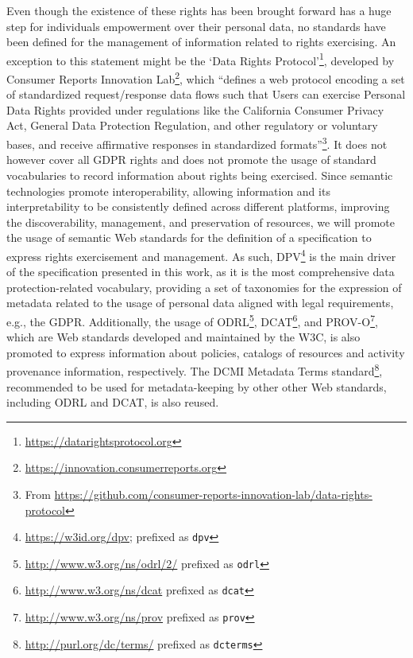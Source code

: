 \documentclass{IOS-Book-Article}     %
\begin{document}
Even though the existence of these rights has been brought forward has a huge step for individuals empowerment over their personal data, no standards have been defined for the management of information related to rights exercising.
An exception to this statement might be the `Data Rights Protocol'\footnote{\url{https://datarightsprotocol.org}}, developed by Consumer Reports Innovation Lab\footnote{\url{https://innovation.consumerreports.org}}, which ``defines a web protocol encoding a set of standardized request/response data flows such that Users can exercise Personal Data Rights provided under regulations like the California Consumer Privacy Act, General Data Protection Regulation, and other regulatory or voluntary bases, and receive affirmative responses in standardized formats''\footnote{From \url{https://github.com/consumer-reports-innovation-lab/data-rights-protocol}}.
It does not however cover all GDPR rights and does not promote the usage of standard vocabularies to record information about rights being exercised.
Since semantic technologies promote interoperability, allowing information and its interpretability to be consistently defined across different platforms, improving the discoverability, management, and preservation of resources, we will promote the usage of semantic Web standards for the definition of a specification to express rights exercisement and management.
As such, DPV\footnote{\url{https://w3id.org/dpv}; prefixed as  \texttt{dpv}}\cite{panditCreatingVocabularyData2019,pandit2024dpv} is the main driver of the specification presented in this work, as it is the most comprehensive data protection-related vocabulary, providing a set of taxonomies for the expression of metadata related to the usage of personal data aligned with legal requirements, e.g., the GDPR.
Additionally, the usage of 
ODRL\footnote{\url{http://www.w3.org/ns/odrl/2/} prefixed as  \texttt{odrl}}\cite{iannella_odrl_2018}, 
DCAT\footnote{\url{http://www.w3.org/ns/dcat} prefixed as \texttt{dcat}}\cite{albertoni_dcat_2024}, and 
PROV-O\footnote{\url{http://www.w3.org/ns/prov} prefixed as \texttt{prov}}\cite{lebo_prov_2013}, 
which are Web standards developed and maintained by the W3C, is also promoted to express information about policies, catalogs of resources and activity provenance information, respectively.
The DCMI Metadata Terms standard\footnote{\url{http://purl.org/dc/terms/} prefixed as \texttt{dcterms}}\cite{dcmi_2020}, recommended to be used for metadata-keeping by other other Web standards, including ODRL and DCAT, is also reused.
\end{document}
